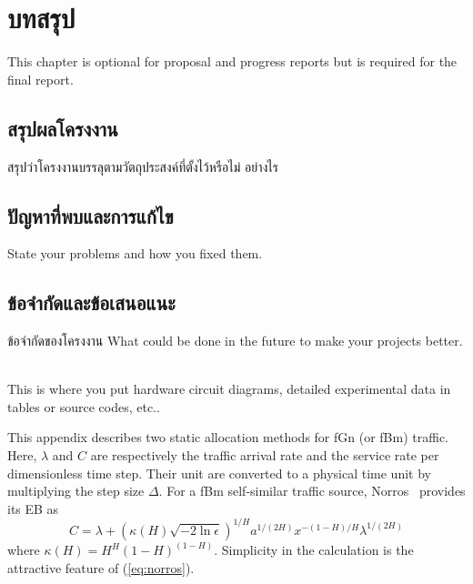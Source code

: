 \documentclass[12pt,oneside,openright,a4paper]{cpe-thai-project}
\begin{document}
\chapter{บทสรุป}

This chapter is optional for proposal and progress reports but 
is required for the final report.

\section{สรุปผลโครงงาน}
สรุปว่าโครงงานบรรลุตามวัตถุประสงค์ที่ตั้งไว้หรือไม่ อย่างไร 

\section{ปัญหาที่พบและการแก้ไข}
State your problems and how you fixed them.

\section{ข้อจำกัดและข้อเสนอแนะ}
ข้อจำกัดของโครงงาน What could be done in the future to make your projects better.


\nocite{*}



 \\

This is where you put hardware circuit diagrams, detailed experimental data in tables or source codes, etc.. \\ \bigskip



This appendix describes two static allocation methods for fGn (or fBm)
traffic. Here, $\lambda$ and $C$ are respectively the traffic arrival
rate and the service rate per dimensionless time step. Their unit are
converted to a physical time unit by multiplying the step size
$\Delta$. For a fBm self-similar traffic source,
Norros~\cite{norros95} provides its EB as
\begin{equation}\label{eq:norros}
  C = \lambda + (\kappa(H)\sqrt{-2\ln\epsilon})^{1/H}a^{1/(2H)}x^{-(1-H)/H}\lambda^{1/(2H)}
\end{equation}
where $\kappa(H) = H^H(1-H)^{(1-H)}$. Simplicity in the calculation is
the attractive feature of (\ref{eq:norros}).
\end{document}
